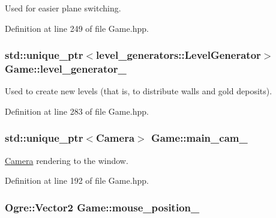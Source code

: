 Used for easier plane switching. 

Definition at line 249 of file Game.\+hpp.

\subsubsection[{\texorpdfstring{level\+\_\+generator\+\_\+}{level_generator_}}]{\setlength{\rightskip}{0pt plus 5cm}std\+::unique\+\_\+ptr$<${\bf level\+\_\+generators\+::\+Level\+Generator}$>$ Game\+::level\+\_\+generator\+\_\+\hspace{0.3cm}{\ttfamily [private]}}\hypertarget{class_game_a180d400b3d9f3781f31822f9141704b2}{}\label{class_game_a180d400b3d9f3781f31822f9141704b2}


Used to create new levels (that is, to distribute walls and gold deposits). 



Definition at line 283 of file Game.\+hpp.

\subsubsection[{\texorpdfstring{main\+\_\+cam\+\_\+}{main_cam_}}]{\setlength{\rightskip}{0pt plus 5cm}std\+::unique\+\_\+ptr$<${\bf Camera}$>$ Game\+::main\+\_\+cam\+\_\+\hspace{0.3cm}{\ttfamily [private]}}\hypertarget{class_game_a0376227db8220eefaf7f6ac310c091f7}{}\label{class_game_a0376227db8220eefaf7f6ac310c091f7}


\hyperlink{class_camera}{Camera} rendering to the window. 



Definition at line 192 of file Game.\+hpp.

\subsubsection[{\texorpdfstring{mouse\+\_\+position\+\_\+}{mouse_position_}}]{\setlength{\rightskip}{0pt plus 5cm}Ogre\+::\+Vector2 Game\+::mouse\+\_\+position\+\_\+\hspace{0.3cm}{\ttfamily [private]}}\hypertarget{class_game_abd514cad4e3b88d5ab87e8f2e966fd4a}{}\label{class_game_abd514cad4e3b88d5ab87e8f2e966fd4a}


